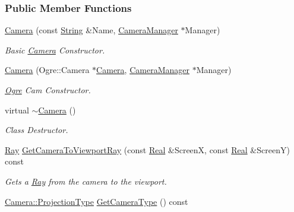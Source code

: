 \subsubsection*{Public Member Functions}
\begin{DoxyCompactItemize}
\item 
\hyperlink{classMezzanine_1_1Camera_a172e91734ebe0cb5d8332ef00606526e}{Camera} (const \hyperlink{namespaceMezzanine_acf9fcc130e6ebf08e3d8491aebcf1c86}{String} \&Name, \hyperlink{classMezzanine_1_1CameraManager}{CameraManager} $\ast$Manager)
\begin{DoxyCompactList}\small\item\em Basic \hyperlink{classMezzanine_1_1Camera}{Camera} Constructor. \item\end{DoxyCompactList}\item 
\hyperlink{classMezzanine_1_1Camera_aa20f07494ece246945eb3cb05f549f82}{Camera} (Ogre::Camera $\ast$\hyperlink{classMezzanine_1_1Camera}{Camera}, \hyperlink{classMezzanine_1_1CameraManager}{CameraManager} $\ast$Manager)
\begin{DoxyCompactList}\small\item\em \hyperlink{namespaceOgre}{Ogre} Cam Constructor. \item\end{DoxyCompactList}\item 
virtual \hyperlink{classMezzanine_1_1Camera_ab25144933c625492a059e57401387c40}{$\sim$Camera} ()
\begin{DoxyCompactList}\small\item\em Class Destructor. \item\end{DoxyCompactList}\item 
\hyperlink{classMezzanine_1_1Ray}{Ray} \hyperlink{classMezzanine_1_1Camera_a4fce77c8b2a0901dc1d22541b98b9437}{GetCameraToViewportRay} (const \hyperlink{namespaceMezzanine_a726731b1a7df72bf3583e4a97282c6f6}{Real} \&ScreenX, const \hyperlink{namespaceMezzanine_a726731b1a7df72bf3583e4a97282c6f6}{Real} \&ScreenY) const 
\begin{DoxyCompactList}\small\item\em Gets a \hyperlink{classMezzanine_1_1Ray}{Ray} from the camera to the viewport. \item\end{DoxyCompactList}\item 
\hyperlink{classMezzanine_1_1Camera_a643bf90630796bca5353967664d5f6e3}{Camera::ProjectionType} \hyperlink{classMezzanine_1_1Camera_aef2f7b71aedee46bacc1341c02a813a2}{GetCameraType} () const 

\end{DoxyCompactItemize}

